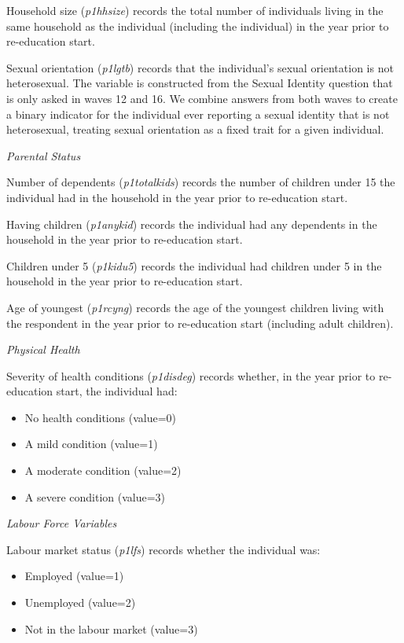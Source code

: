 \documentclass[12pt, a4paper]{article}
\begin{document}
Household size (\textit{p1\textunderscore{}hhsize}) records the total number of individuals living in the same household as the individual (including the individual) in the year prior to re-education start.

Sexual orientation (\textit{p1\textunderscore{}lgtb}) records that the individual’s sexual orientation is not heterosexual.  The variable is constructed from the Sexual Identity question that is only asked in waves 12 and 16. We combine answers from both waves to create a binary indicator for the individual ever reporting a sexual identity that is not heterosexual, treating sexual orientation as a fixed trait for a given individual. 
  
\emph{Parental Status}

Number of dependents (\textit{p1\textunderscore{}totalkids}) records the number of children under 15 the individual had in the household in the year prior to re-education start. 

Having children (\textit{p1\textunderscore{}anykid}) records the individual had any dependents in the household in the year prior to re-education start. 

Children under 5 (\textit{p1\textunderscore{}kidu5}) records the individual had children under 5 in the household in the year prior to re-education start. 

Age of youngest (\textit{p1\textunderscore{}rcyng}) records the age of the youngest children living with the respondent in the year prior to re-education start (including adult children). 

\emph{Physical Health}

Severity of health conditions (\textit{p1\textunderscore{}disdeg}) records whether, in the year prior to re-education start, the individual had:
\begin{itemize}
  \item No health conditions (value=0)
  \item A mild condition (value=1)
  \item A moderate condition (value=2)
  \item A severe condition (value=3)
\end{itemize}  
  
\emph{Labour Force Variables}

Labour market status (\textit{p1\textunderscore{}lfs}) records whether the individual was:
\begin{itemize}
  \item Employed (value=1)
  \item Unemployed (value=2)
  \item Not in the labour market (value=3)
\end{itemize} 
\end{document}
